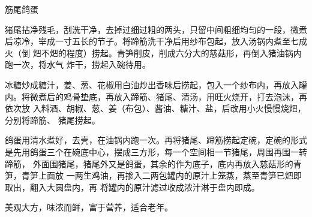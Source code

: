 \begin{recipe}[筋鞭鸽蛋]{筋尾鸽蛋}

\ingredients


\preparation

\step 猪尾拈净残毛，刮洗干净，去掉过细过粗的两头，只留中间粗细均匀的一段，微煮
后凉冷，宰成一寸五长的节子。将蹄筋洗干净后用纱布包起，放入汤锅内煮至七成火（倒
𤆵不𤆵的程度）捞起。青笋削皮，削成六分大的慈菇形，再倒入猪油锅内跑一次，将水气
炸干，捞起入碗待用。

\step 冰糖炒成糖汁，姜、葱、花椒用白油炒出香味后捞起，包入一个纱布内，再放入罐
内。将微煮后的鸡骨垫底，再放入蹄筋、猪尾、清汤，用旺火烧开，打去泡沫，再依次放
入料酒、胡椒、葱、姜（布包）、酱油、糖汁、盐，后改用小火慢慢烧𤆵，分别将蹄筋、
猪尾捞起。

\step 鸽蛋用清水煮好，去壳，在油锅内跑一次。再将猪尾、蹄筋捞起定碗，定碗的形式
是先用鸽蛋三个在碗底中心，摆成三方形，每一个空间相一节猪尾，周围再围一转蹄筋，
外面围猪尾，猪尾外又是鸽蛋，其余的作为底子，底内再放入慈菇形的青笋，青笋上面放
一两生鸡油，再掺入二两包罐内的原汁上笼蒸，蒸至青笋已𤆵即取出，翻入大圆盘内，再
将罐内的原汁滤过收成浓汁淋于盘内即成。

\features

美观大方，味浓而鲜，富于营养，适合老年。

\end{recipe}

